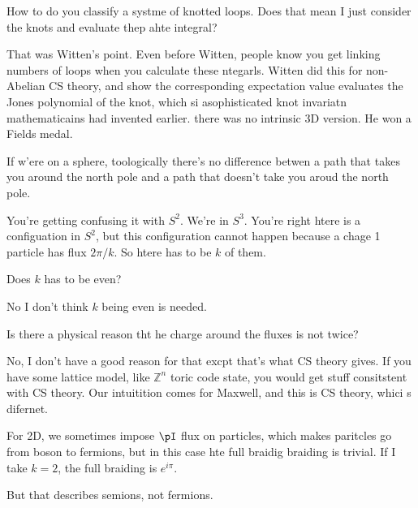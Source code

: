 \begin{question}
    How to do you classify a systme of knotted loops.
    Does that mean I just consider the knots and evaluate thep ahte integral?
\end{question}
That was Witten's point.
Even before Witten,
people know you get linking numbers of loops when you calculate these ntegarls.
Witten did this for non-Abelian CS theory,
and show the corresponding expectation value
evaluates the Jones polynomial of the knot,
which si asophisticated knot invariatn mathematicains had invented earlier.
there was no intrinsic 3D version.
He won a Fields medal.

\begin{question}
    If w'ere on a sphere,
    toologically there's no difference betwen a path that takes you around the
    north pole and a path that doesn't take you aroud the north pole.
\end{question}
You're getting confusing it with $S^2$.
We're in $S^3$.
You're right htere is a configuation in $S^2$,
but this configuration cannot happen
because a chage 1 particle has flux $2\pi /k$.
So htere has to be $k$ of them.

\begin{question}
    Does $k$ has to be even?
\end{question}
No I don't think $k$ being even is needed.

\begin{question}
    Is there a physical reason tht he charge around the fluxes is not twice?
\end{question}
No,
I don't have a good reason for that excpt that's what CS theory gives.
If you have some lattice model,
like $\mathbb{Z}^n$ toric code state,
you would get stuff consitstent with CS theory.
Our intuitition comes for Maxwell,
and this is CS theory,
whici s difernet.

\begin{question}
    For 2D,
    we sometimes impose $\pI$ flux on particles,
    which makes paritcles go from boson to fermions,
    but in this case hte full braidig braiding is trivial.
    If I take $k=2$,
    the full braiding is $e^{i\pi}$.
\end{question}
But that describes semions,
not fermions.

